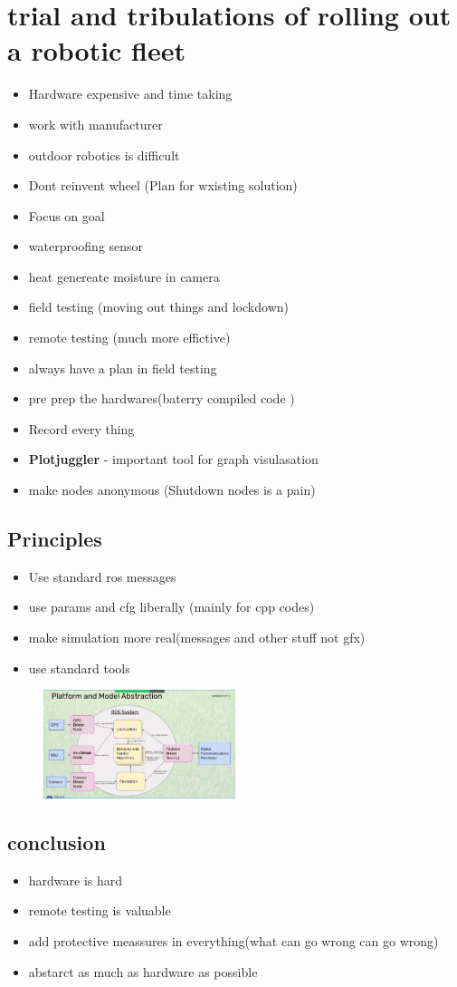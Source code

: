 \documentclass[a4paper]{article}
\begin{document}
\section{trial and tribulations of rolling out a robotic fleet}
\begin{itemize}
	\item Hardware expensive and time taking
	\item work with manufacturer
	\item outdoor robotics is difficult
	\item Dont reinvent wheel (Plan for wxisting solution)
	\item Focus on goal
	\item waterproofing sensor
	\item heat genereate moisture in camera
	\item field testing (moving out things and lockdown)
	\item remote testing (much more effictive)
	\item always have a plan in field testing
	\item pre prep the hardwares(baterry compiled code )
	\item Record every thing
	\item \textbf{Plotjuggler} - important tool for graph visulasation
	\item make nodes anonymous (Shutdown nodes is a pain)
\end{itemize}
\subsection{Principles}
\begin{itemize}
	\item Use standard ros messages
    \item use params and cfg liberally (mainly for cpp codes) 
    \item make simulation more real(messages and other stuff not gfx)
    \item use standard tools 
\end{itemize}
\begin{figure}[htpb]
	\centering
	\includegraphics[width=0.5\textwidth]{platform_abstraction.png}
	\caption{}
	\label{fig:}
\end{figure}
\subsection{conclusion}
\begin{itemize}
    \item hardware is hard 
    \item remote testing is valuable
    \item add protective meassures in everything(what can go wrong can go wrong)
    \item abstarct as much as hardware as possible
\end{itemize}
\end{document}
